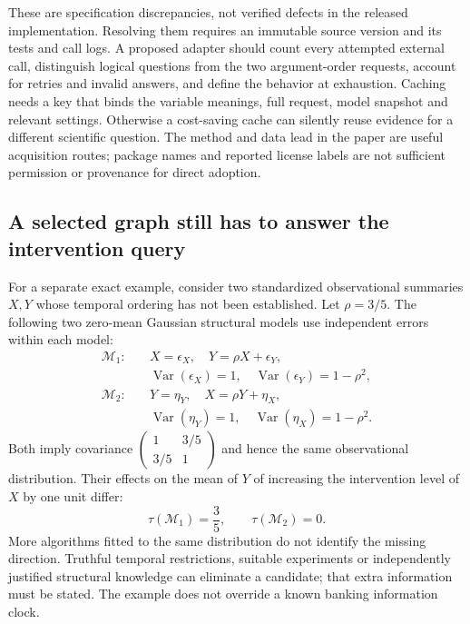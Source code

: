 These are specification discrepancies, not verified defects in the released
implementation. Resolving them requires an immutable source version and its
tests and call logs. A proposed adapter should count every attempted external
call, distinguish logical questions from the two argument-order requests,
account for retries and invalid answers, and define the behavior at exhaustion.
Caching needs a key that binds the variable meanings, full request, model
snapshot and relevant settings. Otherwise a cost-saving cache can silently
reuse evidence for a different scientific question. The method and data lead
in the paper are useful acquisition routes; package names and reported license
labels are not sufficient permission or provenance for direct adoption.

\subsection{A selected graph still has to answer the intervention query}
\label{exec20:expert-identification}

For a separate exact example, consider two standardized observational summaries
$X,Y$ whose temporal ordering has not been established. Let
$\rho=3/5$. The following two zero-mean Gaussian structural models use
independent errors within each model:
\begin{equation}
 \begin{aligned}
 \mathcal M_1:\quad &X=\epsilon_X,\quad Y=\rho X+\epsilon_Y,\\
 &\operatorname{Var}(\epsilon_X)=1,\quad
 \operatorname{Var}(\epsilon_Y)=1-\rho^2,\\[2pt]
 \mathcal M_2:\quad &Y=\eta_Y,\quad X=\rho Y+\eta_X,\\
 &\operatorname{Var}(\eta_Y)=1,\quad
 \operatorname{Var}(\eta_X)=1-\rho^2.
 \end{aligned}
 \label{exec20:expert-worlds}
\end{equation}
Both imply covariance
$\left(\begin{smallmatrix}1&3/5\\3/5&1\end{smallmatrix}\right)$ and hence the
same observational distribution. Their effects on the mean of $Y$ of increasing
the intervention level of $X$ by one unit differ:
\begin{equation}
 \tau(\mathcal M_1)=\frac35,\qquad \tau(\mathcal M_2)=0.
 \label{exec20:expert-effects}
\end{equation}
More algorithms fitted to the same distribution do not identify the missing
direction. Truthful temporal restrictions, suitable experiments or independently
justified structural knowledge can eliminate a candidate; that extra information
must be stated. The example does not override a known banking information clock.
\citep{exec20_expert_averaging_reference}

